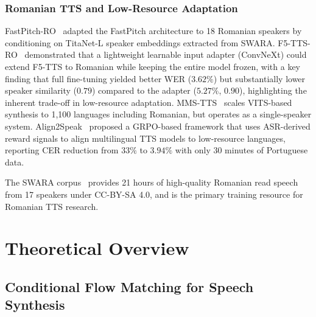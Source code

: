 \documentclass[conference]{IEEEtran}
\begin{document}
\subsubsection{Romanian TTS and Low-Resource Adaptation}

FastPitch-RO~\cite{fastpitch_ro} adapted the FastPitch architecture
to 18 Romanian speakers by conditioning on TitaNet-L speaker
embeddings extracted from SWARA.
F5-TTS-RO~\cite{f5tts_ro} demonstrated that a lightweight
learnable input adapter (ConvNeXt) could extend F5-TTS to Romanian
while keeping the entire model frozen, with a key finding that
full fine-tuning yielded better WER ($3.62\%$) but substantially
lower speaker similarity ($0.79$) compared to the adapter ($5.27\%$,
$0.90$), highlighting the inherent trade-off in low-resource adaptation.
MMS-TTS~\cite{mms} scales VITS-based synthesis to 1,100 languages
including Romanian, but operates as a single-speaker system.
Align2Speak~\cite{align2speak} proposed a GRPO-based framework that
uses ASR-derived reward signals to align multilingual TTS models to
low-resource languages, reporting CER reduction from $33\%$ to $3.94\%$
with only 30 minutes of Portuguese data.

The SWARA corpus~\cite{swara} provides 21 hours of high-quality
Romanian read speech from 17 speakers under CC-BY-SA 4.0, and is the
primary training resource for Romanian TTS research.

\section{Theoretical Overview}
\label{sec:theory}

\subsection{Conditional Flow Matching for Speech Synthesis}
\end{document}
